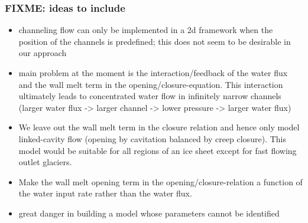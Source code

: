 \documentclass[hide notes,intlimits]{beamer}
\begin{document}
\begin{frame}
  \frametitle{FIXME: ideas to include}

\scriptsize
  \begin{itemize}
  \item channeling flow can only be implemented in a 2d framework when the position of the channels is predefined; this does not seem to be desirable in our approach
  \item main problem at the moment is the interaction/feedback of the water flux and the wall melt term in the opening/closure-equation. This interaction ultimately leads to concentrated water flow in infinitely narrow channels (larger water flux ->  larger channel -> lower pressure -> larger water flux)
  \item We leave out the wall melt term in the closure relation and hence only model linked-cavity flow (opening by cavitation balanced by creep closure). This model would be suitable for all regions of an ice sheet except for fast flowing outlet glaciers.
  \item Make the wall melt opening term in the opening/closure-relation a function of the water input rate rather than the water flux.
  \item \alert{great danger} in building a model whose parameters cannot be identified
  \end{itemize}
\end{frame}
\end{document}
